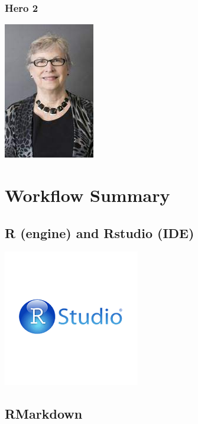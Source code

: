 \documentclass[
]{book}
\begin{document}
\hypertarget{hero-2}{%
\subsection{Hero 2}\label{hero-2}}

\begin{center}\includegraphics{_images/wilma} \end{center}

\hypertarget{workflow-summary}{%
\chapter{Workflow Summary}\label{workflow-summary}}

\hypertarget{r-engine-and-rstudio-ide}{%
\section{R (engine) and Rstudio (IDE)}\label{r-engine-and-rstudio-ide}}

\begin{center}\includegraphics{_images/rstudio} \end{center}

\hypertarget{rmarkdown}{%
\section{RMarkdown}\label{rmarkdown}}
\end{document}
